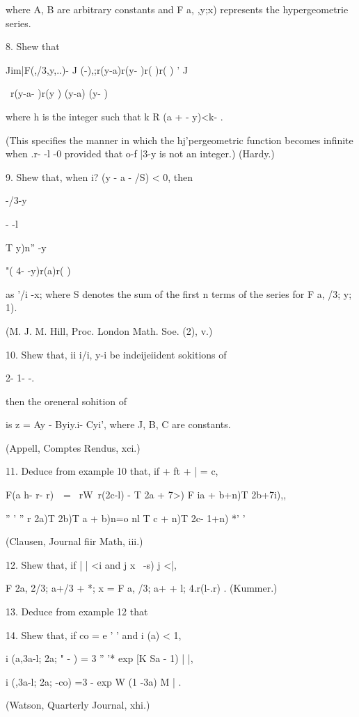 where A, B are arbitrary constants and F a, ,y;x) represents the
hypergeometrie series.


8. Shew that

Jim|F(,/3,y,..)- J (-),;r(y-a)r(y- )r( )r( ) ' J

\ r(y-a- )r(y ) (y-a) (y- )

where h is the integer such that k R (a + - y)<k- .

(This specifies the manner in which the hj'pergeometric function
becomes infinite when .r- -l -0 provided that o-f |3-y is not an
integer.) (Hardy.)

9. Shew that, when i? (y - a - /S) < 0, then

-/3-y

- -l

T y)n'' -y

 "( 4- -y)r(a)r( )

as '/i -x; where S denotes the sum of the first n terms of the series
for F a, /3; y; 1).

(M. J. M. Hill, Proc. London Math. Soe. (2), v.)

%
%

10. Shew that, ii i/i, y-i be indeijeiident sokitions of

 2- 1- -.

then the oreneral sohition of

is z = Ay - Byiy.i- Cyi', where J, B, C are constants.

(Appell, Comptes Rendus, xci.)

11. Deduce from example 10 that, if + ft + | = c,

 F(a h- r- r)\ \ = \ rW\ r(2c-l) - T 2a + 7>) F ia + b+n)T 2b+7i),,

'' ' '' r 2a)T 2b)T a + b)n=o nl T c + n)T 2c- 1+n) *' '

(Clausen, Journal fiir Math, iii.)

12. Shew that, if | | <i and j x \ -s) j <|,

F 2a, 2/3; a+/3 + *; x = F a, /3; a+ + l; 4.r(l-.r) . (Kummer.)

13. Deduce from example 12 that

14. Shew that, if co = e ' ' and i (a) < 1,

i (a,3a-l; 2a; " - ) = 3 '' '* exp [K Sa - 1) | |,

i (,3a-l; 2a; -co) =3 - exp W (1 -3a) M | .

(Watson, Quarterly Journal, xhi.)

